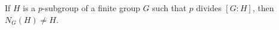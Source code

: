 If $H$ is a $p$-subgroup of a finite group $G$ such that $p$ divides $[G : H]$, then $N_G(H) \neq H$.
